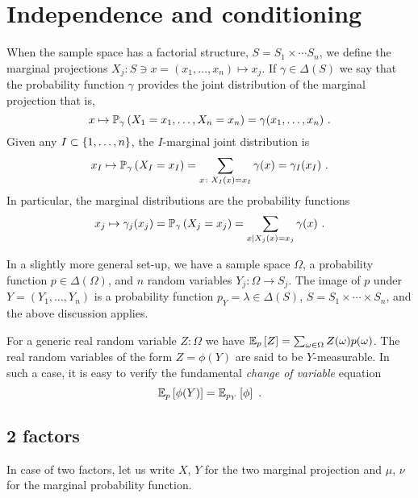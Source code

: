 \documentclass[12pt,a4paper]{amsart}
\theoremstyle{plain}%
\theoremstyle{definition}
\theoremstyle{remark}
\begin{document}
\section{Independence and conditioning}
\label{sec:indep-cond}
When the sample space has a factorial structure, $S=S_1 \times \cdots S_n$, we define the marginal projections $X_j \colon S \ni x = (x_1,\dots,x_n) \mapsto x_j$. If $\gamma \in \Delta(S)$ we say that the probability function $\gamma$ provides the joint distribution of the marginal projection that is,
\begin{equation*}
  x \mapsto \operatorname{\mathbb P}_{\gamma}\left(X_1=x_1,\dots,X_n=x_n\right) = \gamma(x_1,\dots,x_n) \ .
\end{equation*}
Given any $I \subset \left\{1,\dots,n\right\}$, the $I$-marginal joint distribution is
\begin{equation*}
  x_I \mapsto \operatorname{\mathbb P}_{\gamma}\left(X_I = x_I\right) = \sum_{x \colon X_I(x)=x_I} \gamma(x) = \gamma_I(x_I) \ .
\end{equation*}
In particular, the marginal distributions are the probability functions
\begin{equation*}
 x_j \mapsto \gamma_j(x_j) = \operatorname{\mathbb P}_{\gamma}\left(X_j = x_j\right) = \sum_{x | X_j(x) = x_j} \gamma(x) \ .
\end{equation*}

In a slightly more general set-up, we have a sample space $\Omega$, a
probability function $p \in \Delta(\Omega)$, and $n$ random variables
$Y_j \colon \Omega \to S_j$. The image of $p$ under $Y =
(Y_1,\dots,Y_n)$ is a probability function $p_Y = \lambda \in
\Delta(S)$, $S=S_1 \times \cdots \times S_n$, and the above discussion
applies.

For a generic real random variable $Z \colon \Omega$ we have
$\operatorname{\mathbb E}_{p}\left[Z\right] = \sum_{\omega\in\Omega} Z(\omega)p(\omega)$. The real
random variables of the form $Z = \phi(Y)$ are said to be
$Y$-measurable. In such a case, it is easy to verify the fundamental
\emph{change of variable} equation
\begin{equation*}
  \operatorname{\mathbb E}_{p}\left[\phi(Y)\right] = \operatorname{\mathbb E}_{p_Y}\left[\phi\right] \ .
\end{equation*}

\subsection{2 factors}

In case of two factors, let us write $X$, $Y$ for the two marginal
projection and $\mu$, $\nu$ for the marginal probability function.
\end{document}
